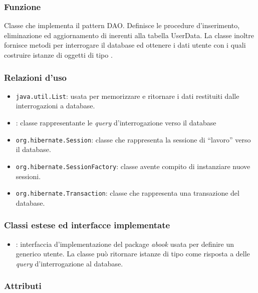 
\subsubsection*{Funzione}
Classe che implementa il pattern DAO. Definisce le procedure d'inserimento, eliminazione ed aggiornamento di  inerenti alla tabella UserData. La classe inoltre fornisce metodi per interrogare il database ed ottenere i dati utente con i quali costruire istanze di oggetti di tipo .

\subsubsection*{Relazioni d'uso}

\begin{itemize}
	\item \texttt{java.util.List}: usata per memorizzare e ritornare i dati restituiti dalle interrogazioni a database.
	\item {}: classe rappresentante le \textit{query} d'interrogazione verso il database
	\item \texttt{org.hibernate.Session}: classe che rappresenta la sessione di ``lavoro'' verso il database.
	\item \texttt{org.hibernate.SessionFactory}: classe avente compito di instanziare nuove sessioni.
	\item \texttt{org.hibernate.Transaction}: classe che rappresenta una transazione del database.
	
\end{itemize}

\subsubsection*{Classi estese ed interfacce implementate}
\begin{itemize}
	\item {}: interfaccia d'implementazione del package \textit{abook} usata per definire un generico utente. La classe può ritornare istanze di tipo  come risposta a delle \textit{query} d'interrogazione al database.
\end{itemize}

\subsubsection*{Attributi}

